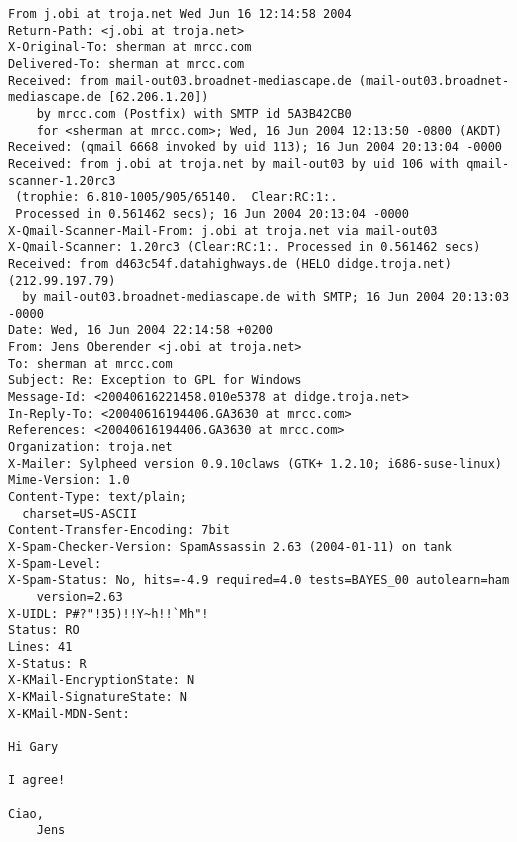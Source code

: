 \begin{small}
\begin{verbatim}
From j.obi at troja.net Wed Jun 16 12:14:58 2004
Return-Path: <j.obi at troja.net>
X-Original-To: sherman at mrcc.com
Delivered-To: sherman at mrcc.com
Received: from mail-out03.broadnet-mediascape.de (mail-out03.broadnet-mediascape.de [62.206.1.20])
	by mrcc.com (Postfix) with SMTP id 5A3B42CB0
	for <sherman at mrcc.com>; Wed, 16 Jun 2004 12:13:50 -0800 (AKDT)
Received: (qmail 6668 invoked by uid 113); 16 Jun 2004 20:13:04 -0000
Received: from j.obi at troja.net by mail-out03 by uid 106 with qmail-scanner-1.20rc3 
 (trophie: 6.810-1005/905/65140.  Clear:RC:1:. 
 Processed in 0.561462 secs); 16 Jun 2004 20:13:04 -0000
X-Qmail-Scanner-Mail-From: j.obi at troja.net via mail-out03
X-Qmail-Scanner: 1.20rc3 (Clear:RC:1:. Processed in 0.561462 secs)
Received: from d463c54f.datahighways.de (HELO didge.troja.net) (212.99.197.79)
  by mail-out03.broadnet-mediascape.de with SMTP; 16 Jun 2004 20:13:03 -0000
Date: Wed, 16 Jun 2004 22:14:58 +0200
From: Jens Oberender <j.obi at troja.net>
To: sherman at mrcc.com
Subject: Re: Exception to GPL for Windows
Message-Id: <20040616221458.010e5378 at didge.troja.net>
In-Reply-To: <20040616194406.GA3630 at mrcc.com>
References: <20040616194406.GA3630 at mrcc.com>
Organization: troja.net
X-Mailer: Sylpheed version 0.9.10claws (GTK+ 1.2.10; i686-suse-linux)
Mime-Version: 1.0
Content-Type: text/plain;
  charset=US-ASCII
Content-Transfer-Encoding: 7bit
X-Spam-Checker-Version: SpamAssassin 2.63 (2004-01-11) on tank
X-Spam-Level: 
X-Spam-Status: No, hits=-4.9 required=4.0 tests=BAYES_00 autolearn=ham 
	version=2.63
X-UIDL: P#?"!35)!!Y~h!!`Mh"!
Status: RO
Lines: 41
X-Status: R
X-KMail-EncryptionState: N
X-KMail-SignatureState: N
X-KMail-MDN-Sent:  

Hi Gary

I agree!

Ciao,
	Jens



\end{verbatim}
\end{small}
